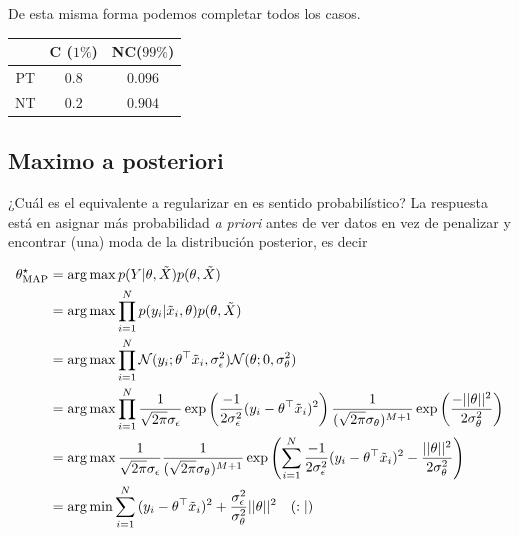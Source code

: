 {\begin{minipage}{\linewidth}
De esta misma forma podemos completar todos los casos.
\\
\centering
\begin{tabular}{c|cc}
\toprule
   & C ($1\%$) &  NC($99\%$) \\\hline
PT & $0.8$ & $0.096$\\
NT & $0.2$ & $0.904$ \\
\bottomrule
\end{tabular}
\label{table:cancer}

\end{minipage}}



\subsection{Maximo a posteriori} %
\label{sub:map}

¿Cuál es el equivalente a regularizar en es sentido probabilístico? La respuesta está en asignar más probabilidad \emph{a priori} antes de ver datos en vez de penalizar y encontrar (una) moda de la distribución posterior, es decir 


\begin{align}
	\theta_\text{MAP}^\star 	&= \operatorname*{arg\,max} p(Y|\theta,\tilde{X})p(\theta,\tilde{X})\\
								&= \operatorname*{arg\,max} \prod_{i=1}^Np(y_i|\tilde{x}_i,\theta)p(\theta,\tilde{X})\\
								&= \operatorname*{arg\,max} \prod_{i=1}^N {\mathcal N}(y_i;\theta^\top\tilde{x}_i,\sigma_\epsilon^2){\mathcal N}(\theta;0,\sigma_\theta^2) \\
								&= \operatorname*{arg\,max} \prod_{i=1}^N \frac{1}{\sqrt{2\pi}\sigma_\epsilon} \exp\left({\frac{-1}{2\sigma_\epsilon^2}(y_i-\theta^\top\tilde{x}_i)^2}\right)
											\frac{1}{(\sqrt{2\pi}\sigma_\theta)^{M+1}} \exp\left({\frac{-||\theta||^2}{2\sigma_\theta^2}}\right) \\
								&= \operatorname*{arg\,max}  \frac{1}{\sqrt{2\pi}\sigma_\epsilon} \frac{1}{(\sqrt{2\pi}\sigma_\theta)^{M+1}}
											\exp\left( \sum_{i=1}^N{\frac{-1}{2\sigma_\epsilon^2}(y_i-\theta^\top\tilde{x}_i)^2} -{\frac{||\theta||^2}{2\sigma_\theta^2}}\right) \\
								&= \operatorname*{arg\,min} \sum_{i=1}^N{(y_i-\theta^\top\tilde{x}_i)^2} +{\frac{\sigma_\epsilon^2}{\sigma_\theta^2}||\theta||^2}\quad {\tt (:|)}
\end{align}

